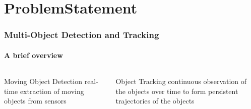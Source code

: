 \section{ProblemStatement}

\begin{frame}
	\frametitle{Multi-Object Detection and Tracking}
	\framesubtitle{A brief overview}
	
	\begin{columns}[t]
		\centering
		
		\vspace{0.4cm}
		
		\begin{block}{Moving Object Detection}
			real-time extraction of moving objects from sensors
		\end{block}
		
		\vspace{1.3cm}
		
		\begin{block}{Object Tracking \cite{Yilmaz06}}
			continuous observation of the objects over time to form persistent trajectories of the objects
		\end{block}
		
		\centering
		
		

\end{columns}
\end{frame}
